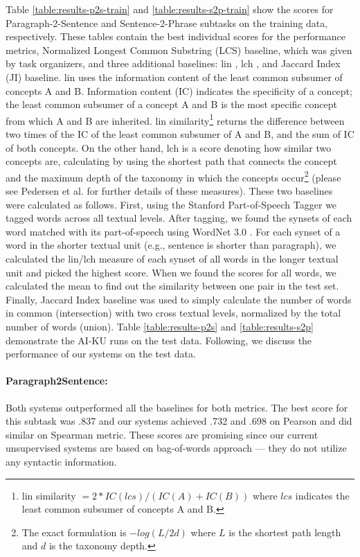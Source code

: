 \documentclass[11pt]{article}
\begin{document}
Table \ref{table:results-p2s-train} and \ref{table:results-s2p-train} show the scores for Paragraph-2-Sentence and Sentence-2-Phrase subtasks on the training data, respectively. These tables contain the best individual scores for the performance metrics, Normalized Longest Common Substring (LCS) baseline, which was given by task organizers, and three additional baselines: lin \cite{lin1998information}, lch \cite{leacock1998combining}, and Jaccard Index (JI) baseline. lin uses the information content \cite{resnik1995inforcontent} of the least common subsumer  of concepts A and B. Information content (IC) indicates the specificity of a concept; the least common subsumer of a concept A and B is the most specific concept from which A and B are inherited. lin similarity\footnote{lin similarity $=  2 * IC(lcs) / (IC(A) + IC(B))$ where $lcs$ indicates the least common subsumer of concepts A and B.} returns the difference between two times of the IC of the least common subsumer of A and B, and the sum of IC of both 
concepts. On the other hand, lch is a score denoting how similar two concepts are, calculating by using the shortest path that connects the concept and the maximum depth of the taxonomy in which the concepts occur\footnote{The exact formulation is $-log(L/2d)$ where $L$ is the shortest path length and $d$ is the taxonomy depth.} (please see Pedersen et al.  for further details of these measures). These two baselines were calculated as follows. First, using the Stanford Part-of-Speech Tagger \cite{toutanova2000enriching} we tagged words across all textual levels. After tagging, we found the synsets of each word matched with its part-of-speech using WordNet 3.0 \cite{fellbaum98electronic}. For each synset of a word in the shorter textual unit (e.g., sentence is shorter than paragraph), we calculated the lin/lch measure of each synset of all words in the longer textual unit and picked the highest score. When we found the scores for all words, we calculated 
the mean to find out the similarity between one pair in the test set. Finally, Jaccard Index baseline was used to simply 
calculate the number of words in common (intersection) with two cross textual levels, normalized by the total number of words (union). Table \ref{table:results-p2s} and \ref{table:results-s2p} demonstrate the AI-KU runs on the test data. Following, we discuss the performance of our systems on the test data.

\paragraph{Paragraph2Sentence:} Both systems outperformed all the baselines for both metrics. The best score for this subtask was .837 and our systems achieved .732 and .698 on Pearson and did similar on Spearman metric. These scores are promising since our current unsupervised systems are based on bag-of-words approach --- they do not utilize any syntactic information.
\end{document}
